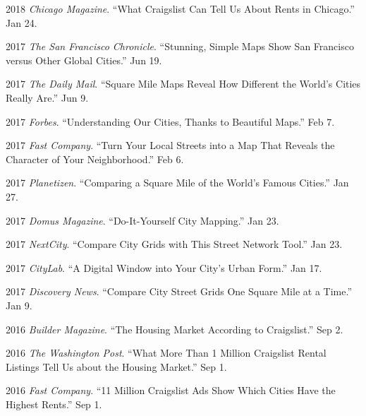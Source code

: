 \documentclass{academiccv}
\begin{document}
\begin{tablist}
	
\item 2018 \tab \emph{Chicago Magazine}. \enquote{What Craigslist Can Tell Us About Rents in Chicago.} Jan 24.
	
\item 2017 \tab \emph{The San Francisco Chronicle}. \enquote{Stunning, Simple Maps Show San Francisco versus Other Global Cities.} Jun 19.

\item 2017 \tab \emph{The Daily Mail}. \enquote{Square Mile Maps Reveal How Different the World's Cities Really Are.} Jun 9.

\item 2017 \tab \emph{Forbes}. \enquote{Understanding Our Cities, Thanks to Beautiful Maps.} Feb 7.

\item 2017 \tab \emph{Fast Company}. \enquote{Turn Your Local Streets into a Map That Reveals the Character of Your Neighborhood.} Feb 6.

\item 2017 \tab \emph{Planetizen}. \enquote{Comparing a Square Mile of the World's Famous Cities.} Jan 27.

\item 2017 \tab \emph{Domus Magazine}. \enquote{Do-It-Yourself City Mapping.} Jan 23.

\item 2017 \tab \emph{NextCity}. \enquote{Compare City Grids with This Street Network Tool.} Jan 23.

\item 2017 \tab \emph{CityLab}. \enquote{A Digital Window into Your City's Urban Form.} Jan 17.

\item 2017 \tab \emph{Discovery News}. \enquote{Compare City Street Grids One Square Mile at a Time.} Jan 9.

\item 2016 \tab \emph{Builder Magazine}. \enquote{The Housing Market According to Craigslist.} Sep 2.

\item 2016 \tab \emph{The Washington Post}. \enquote{What More Than 1 Million Craigslist Rental Listings Tell Us about the Housing Market.} Sep 1.

\item 2016 \tab \emph{Fast Company}. \enquote{11 Million Craigslist Ads Show Which Cities Have the Highest Rents.} Sep 1.


\end{tablist}
\end{document}
